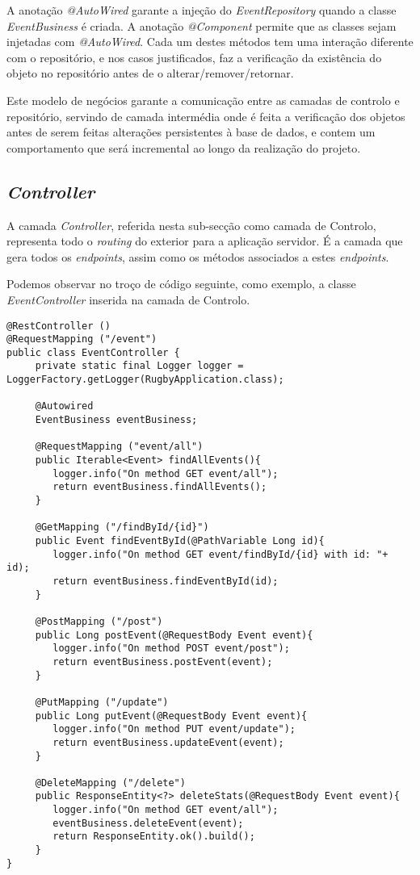 A anotação \emph{@AutoWired} garante a injeção do \emph{EventRepository} quando a classe \emph{EventBusiness} é criada. A anotação \emph{@Component} permite que as classes sejam injetadas com \emph{@AutoWired}. Cada um destes métodos tem uma interação diferente com o repositório, e nos casos justificados, faz a verificação da existência do objeto no repositório antes de o alterar/remover/retornar.

Este modelo de negócios garante a comunicação entre as camadas de controlo e repositório, servindo de camada intermédia onde é feita a verificação dos objetos antes de serem feitas alterações persistentes à base de dados, e contem um comportamento que será incremental ao longo da realização do projeto.

\subsection{\emph{Controller}} \label{sec314}
A camada \emph{Controller}, referida nesta sub-secção como camada de Controlo, representa todo o \emph{routing} do exterior para a aplicação servidor. É a camada que gera todos os \emph{endpoints}, assim como os métodos associados a estes \emph{endpoints}. 

Podemos observar no troço de código seguinte, como exemplo, a classe \emph{EventController} inserida na camada de Controlo.

\begin{lstlisting}
@RestController ()
@RequestMapping ("/event")
public class EventController {
	 private static final Logger logger = LoggerFactory.getLogger(RugbyApplication.class);
	
	 @Autowired
	 EventBusiness eventBusiness;
	
	 @RequestMapping ("event/all")
	 public Iterable<Event> findAllEvents(){
	 	logger.info("On method GET event/all");
	 	return eventBusiness.findAllEvents();
	 }
	
	 @GetMapping ("/findById/{id}")
	 public Event findEventById(@PathVariable Long id){
	 	logger.info("On method GET event/findById/{id} with id: "+ id);
	 	return eventBusiness.findEventById(id);
	 }
	
	 @PostMapping ("/post")
	 public Long postEvent(@RequestBody Event event){
	 	logger.info("On method POST event/post");
	 	return eventBusiness.postEvent(event);
	 }
	
	 @PutMapping ("/update")
	 public Long putEvent(@RequestBody Event event){
	 	logger.info("On method PUT event/update");
	 	return eventBusiness.updateEvent(event);
	 }
	
	 @DeleteMapping ("/delete")
	 public ResponseEntity<?> deleteStats(@RequestBody Event event){
	 	logger.info("On method GET event/all");
	 	eventBusiness.deleteEvent(event);
	 	return ResponseEntity.ok().build();
	 }
}
\end{lstlisting}

